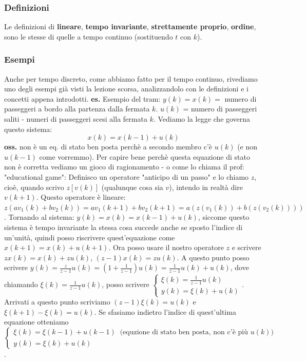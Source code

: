 \subsubsection{Definizioni}
Le definizioni di \textbf{lineare}, \textbf{tempo invariante}, \textbf{strettamente proprio}, \textbf{ordine}, sono le stesse di quelle a tempo continuo (sostituendo $t$ con $k$).
\subsubsection{Esempi}
Anche per tempo discreto, come abbiamo fatto per il tempo continuo, rivediamo uno degli esempi già visti la lezione scorsa, analizzandolo con le definizioni e i concetti appena introdotti.\newline
\newline
\textbf{es.} Esempio del tram:\newline
$y(k) = x(k) =$ numero di passeggeri a bordo alla partenza dalla fermata $k$.\newline
$u(k)$ = numero di passeggeri saliti - numeri di passeggeri scesi alla fermata $k$.\newline
Vediamo la legge che governa questo sistema:
\[
        x(k) = x(k-1) + u(k)
\]
\textbf{oss.} non è un eq. di stato ben posta perchè a secondo membro c'è $u(k)$ (e non $u(k-1)$ come vorremmo).\newline
\newline
Per capire bene perchè questa equazione di stato non è corretta vediamo un gioco di ragionamento - o come lo chiama il prof: "educational game":\newline
\newline
Definisco un operatore "anticipo di un passo" e lo chiamo $z$, cioè, quando scrivo $z[v(k)]$ (qualunque cosa sia $v$), intendo in realtà dire $v(k+1)$. Questo operatore è lineare: $z (a v_1(k) + b v_2(k)) = a v_1(k+1) + b v_2(k+1) = a (z(v_1(k)) + b (z(v_2(k))))$.\newline
Tornando al sistema: $y(k) = x(k) = x(k-1) + u(k)$, siccome questo sistema è tempo invariante la stessa cosa succede anche se sposto l'indice di un'unità, quindi posso riscrivere quest'equazione come $x(k+1) = x(k) + u (k+1)$. Ora posso usare il nostro operatore $z$ e scrivere $zx(k) = x(k) + zu(k)$, $(z-1) x(k) = z u(k)$.\newline
A questo punto posso scrivere $y(k) = \frac{z}{z-1}u(k) = (1+ \frac{1}{z-1})u(k) = \frac{1}{z-1}u(k) + u(k)$, dove chiamando $\xi(k) = \frac{1}{z-1}u(k)$, posso scrivere $\begin{cases}
    \xi(k) = \frac{1}{z-1}u(k)\\
    y(k) = \xi(k) + u(k)
\end{cases}$. Arrivati a questo punto scriviamo $(z-1) \xi (k) = u(k)$ e $\xi(k+1) - \xi(k) = u(k)$. Se sfasiamo indietro l'indice di quest'ultima equazione otteniamo $\begin{cases}
    \xi (k) = \xi(k-1) + u(k-1) \;\; \text{(equzione di stato ben posta, non c'è più $u(k)$)}\;\\
    y(k) = \xi(k) + u(k)
\end{cases}$.\newline
